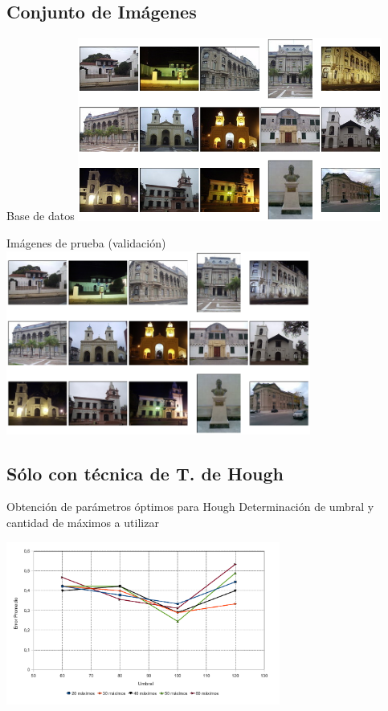 \documentclass[spanish]{beamer}
\begin{document}
\subsection{Conjunto de Imágenes}
\begin{frame}{Base de datos}
  \includegraphics[width=10cm]{img/mosaico.png}
\end{frame}
%
\begin{frame}{Imágenes de prueba (validación)}
  \includegraphics[width=10cm]{img/pruebas.png}
\end{frame}
%
\subsection{Sólo con técnica de T. de Hough}
\begin{frame}{Obtención de parámetros óptimos para Hough}
  Determinación de umbral y cantidad de máximos a utilizar
  \begin{center}
    \includegraphics[width=9cm]{../diagramas/estadistica_noche_iguales}
  \end{center}
\end{frame}
%
\end{document}
